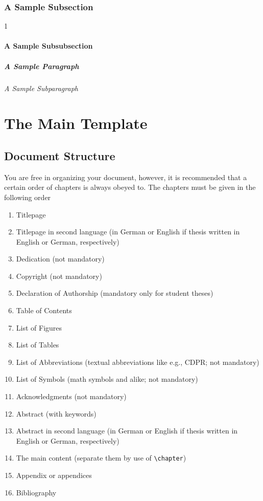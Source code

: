 \subsection{A Sample Subsection}

1\lipsum[1-3]

\subsubsection{A Sample Subsubsection}

\lipsum[1-3]

\paragraph{A Sample Paragraph}
\lipsum[1-3]

\subparagraph{A Sample Subparagraph}
\lipsum[1-3]


\chapter{The Main Template}

\section{Document Structure}

You are free in organizing your document, however, it is recommended that a certain order of chapters is always obeyed to. The chapters must be given in the following order

\begin{enumerate}
    \item Titlepage
    \item Titlepage in second language (in German or English if thesis written in English or German, respectively)
    \item Dedication (not mandatory)
    \item Copyright (not mandatory)
    \item Declaration of Authorship (mandatory only for student theses)
    \item Table of Contents
    \item List of Figures
    \item List of Tables
    \item List of Abbreviations (textual abbreviations like e.g., CDPR; not mandatory)
    \item List of Symbols (math symbols and alike; not mandatory)
    \item Acknowledgments (not mandatory)
    \item Abstract (with keywords)
    \item Abstract in second language (in German or English if thesis written in English or German, respectively)
    \item The main content (separate them by use of \lstinline!\chapter!)
    \item Appendix or appendices
    \item Bibliography
\end{enumerate}

